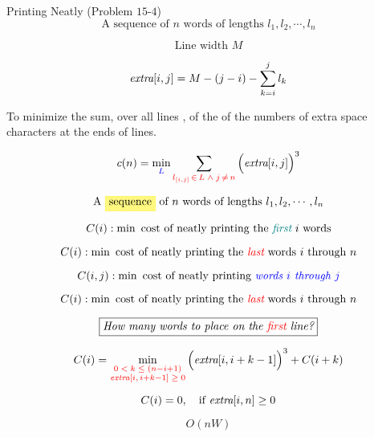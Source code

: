 
\begin{frame}{}
  \begin{exampleblock}{Printing Neatly (Problem $15$-$4$)}
    \[
      \text{A sequence of $n$ words of lengths } l_1, l_2, \cdots, l_n
    \]

    \[
      \text{Line width } M
    \]

    \[
      \text{\it extra}[i,j] = M - (j-i) - \sum_{k=i}^{j} l_k
    \]

    \pause
    \begin{center}
      To minimize the sum, over all lines , of the  of the numbers of
      extra space characters at the ends of lines.
    \end{center}

    \[
      c(n) = \min_{\textcolor{blue}{L}} \sum_{\textcolor{red}{l_{[i,j]} \,\in\, L \;\land\; j \,\neq\, n}} \Big(\text{\it extra}[i,j]\Big)^3
    \]
  \end{exampleblock}
\end{frame}

\begin{frame}{}
\end{frame}

\begin{frame}{}
  \[
    \text{A \hl{yellow}{sequence} of $n$ words of lengths } l_1, l_2, \cdots, l_n
  \]

  \pause
  \vspace{0.50cm}
  \[
    C(i): \min \text{ cost of neatly printing the \textcolor{teal}{\it first} $i$ words}
  \]

  \[
    C(i): \min \text{ cost of neatly printing the \textcolor{red}{\it last} words $i$ through $n$}
  \]

  \[
    C(i,j): \min \text{ cost of neatly printing \textcolor{blue}{\it words $i$ through $j$}}
  \]
\end{frame}

\begin{frame}{}
  \[
    C(i): \min \text{ cost of neatly printing the \textcolor{red}{\it last} words $i$ through $n$}
  \]

  \pause
  \[
    \fbox{\text{\it How many words to place on the \textcolor{red}{first} line?}}
  \]

  \pause
  \vspace{0.50cm}
  \[
    C(i) = \min_{\textcolor{red}{\substack{0 \;<\; k \;\le\; (n-i+1) \\ \text{\it extra}[i,\, i+k-1] \;\ge\; 0}}} \Big(\text{\it extra}[i, i+k-1]\Big)^3 + C(i+k)
  \]

  \pause
  \vspace{0.30cm}
  \[
    C(i) = 0, \quad \text{if {\it extra}}[i,n] \ge 0 
  \]

  \pause
  \[
    O(nW)
  \]
\end{frame}

